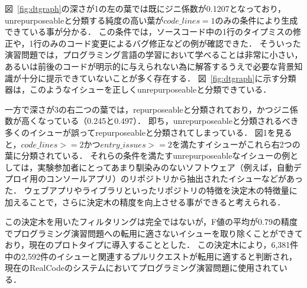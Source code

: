 図~\ref{fig:dtgraph}の深さが1の左の葉では既にジニ係数が0.1207となっており，unrepurposeableと分類する純度の高い葉が$\textit{code\_lines}=1$のみの条件により生成できている事が分かる．
この条件では，ソースコード中の1行のタイプミスの修正や，1行のみのコード変更によるバグ修正などの例が確認できた．
そういった演習問題では，プログラミング言語の学習において学べることは非常に小さい，あるいは前後のコードが明示的に与えられない為に解答するうえで必要な背景知識が十分に提示できていないことが多く存在する．
図~\ref{fig:dtgraph}に示す分類器は，このようなイシューを正しくunrepurposeableと分類できている．

一方で深さが3の右二つの葉では，repurposeableと分類されており，かつジニ係数が高くなっている（0.245と0.497）．
即ち，unrepurposeableと分類されるべき多くのイシューが誤ってrepurposeableと分類されてしまっている．
図1を見ると，$\textit{code\_lines} >= 2$かつ$\textit{entry\_issues} >= 2$を満たすイシューがこれら右2つの葉に分類されている．
それらの条件を満たすunrepurposeableなイシューの例としては，実験参加者にとってあまり馴染みのないソフトウェア（例えば，自動デプロイ用のコンソールアプリ）のリポジトリから抽出されたイシューなどがあった．
ウェブアプリやライブラリといったリポジトリの特徴を決定木の特徴量に加えることで，さらに決定木の精度を向上させる事ができると考えられる．

この決定木を用いたフィルタリングは完全ではないが，F値の平均が0.79の精度でプログラミング演習問題への転用に適さないイシューを取り除くことができており，現在のプロトタイプに導入することとした．
この決定木により，6,381件中の2,592件のイシューと関連するプルリクエストが転用に適すると判断され，現在のRealCodeのシステムにおいてプログラミング演習問題に使用されている．









